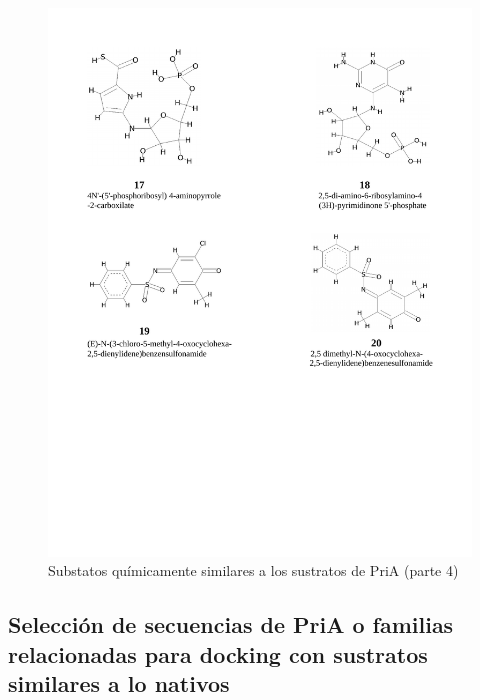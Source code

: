 \documentclass[12pt,twoside]{reedthesis}
\begin{document}
{  \begin{figure}[h!tbp]
  \centering
  \includegraphics[angle = 0,scale = .8]{chapter4/esquema_quimico-4-4.pdf}
  \caption[Substatos químicamente similares a los sustratos de PriA (parte 4)]{\footnotesize{Substatos químicamente similares a los sustratos de PriA (parte 4)}}
  \label{fig:Eschema4}
  \end{figure}
  
  \clearpage  
  
  \subsection{Selección de secuencias de PriA o familias relacionadas para
  docking con sustratos similares a lo
  nativos}\label{seleccion-de-secuencias-de-pria-o-familias-relacionadas-para-docking-con-sustratos-similares-a-lo-nativos}
  
}
\end{document}
